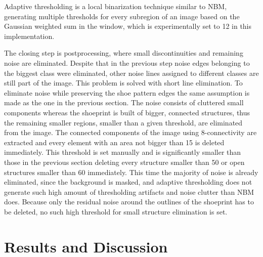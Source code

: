 \documentclass[draft,final]{vutinfth} %
\begin{document}
Adaptive thresholding is a local binarization technique similar to NBM, generating multiple thresholds for every subregion of an image based on the Gaussian weighted sum in the window, which is experimentally set to 12 in this implementation.
\par
The closing step is postprocessing, where small discontinuities and remaining noise are eliminated.
Despite that in the previous step noise edges belonging to the biggest class were eliminated, other noise lines assigned to different classes are still part of the image.
This problem is solved with short line elimination.
To eliminate noise while preserving the shoe pattern edges the same assumption is made as the one in the previous section.
The noise consists of cluttered small components whereas the shoeprint is built of bigger, connected structures, thus the remaining smaller regions, smaller than a given threshold, are eliminated from the image.
The connected components of the image using 8-connectivity are extracted and every element with an area not bigger than 15 is deleted immediately.
This threshold is set manually and is significantly smaller than those in the previous section deleting every structure smaller than 50 or open structures smaller than 60 immediately.
This time the majority of noise is already eliminated, since the background is masked, and adaptive thresholding does not generate such high amount of thresholding artifacts and noise clutter than NBM does.
Because only the residual noise around the outlines of the shoeprint has to be deleted, no such high threshold for small structure elimination is set.

\chapter{Results and Discussion}

\end{document}
